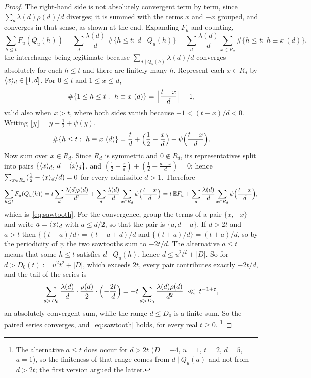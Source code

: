 \documentclass[11pt,a4paper]{article}
\theoremstyle{remark}\newtheorem{remark}[theorem]{Remark}
\begin{document}
\begin{proof}
The right-hand side is not absolutely convergent term by term, since $\sum_d\lambda(d)\rho(d)/d$ diverges; it is summed
with the terms $x$ and $-x$ grouped, and converges in that sense, as shown at the end. Expanding $F_u$ and counting,
\[
\sum_{h\le t}F_u(Q_u(h))=\sum_{d}\frac{\lambda(d)}d\,\#\{h\le t:\ d\mid Q_u(h)\}
=\sum_{d}\frac{\lambda(d)}d\sum_{x\in R_d}\#\{h\le t:\ h\equiv x\ (d)\},
\]
the interchange being legitimate because $\sum_{d\mid Q_u(h)}\lambda(d)/d$ converges absolutely for each $h\le t$ and
there are finitely many $h$. Represent each $x\in R_d$ by $\langle x\rangle_{d}\in[1,d]$. For $0\le t$ and $1\le x\le d$,
\[
\#\{1\le h\le t:\ h\equiv x\ (d)\}=\Bigl\lfloor\frac{t-x}d\Bigr\rfloor+1,
\]
valid also when $x>t$, where both sides vanish because $-1<(t-x)/d<0$. Writing $\lfloor y\rfloor=y-\tfrac12+\psi(y)$,
\[
\#\{h\le t:\ h\equiv x\ (d)\}=\frac td+\Bigl(\frac12-\frac xd\Bigr)+\psi\Bigl(\frac{t-x}d\Bigr).
\]
Now sum over $x\in R_d$. Since $R_d$ is symmetric and $0\notin R_d$, its representatives split into pairs
$\{\langle x\rangle_{d},\,d-\langle x\rangle_{d}\}$, and $(\tfrac12-\tfrac xd)+(\tfrac12-\tfrac{d-x}d)=0$; hence
$\sum_{x\in R_d}(\tfrac12-\langle x\rangle_{d}/d)=0$ for every admissible $d>1$. Therefore
\[
\sum_{h\le t}F_u(Q_u(h))=t\sum_{d}\frac{\lambda(d)\rho(d)}{d^2}+\sum_d\frac{\lambda(d)}d\sum_{x\in R_d}\psi\Bigl(\frac{t-x}d\Bigr)
=t\,\mathbb EF_u+\sum_d\frac{\lambda(d)}d\sum_{x\in R_d}\psi\Bigl(\frac{t-x}d\Bigr),
\]
which is~\eqref{eq:sawtooth}. For the convergence, group the terms of a pair $\{x,-x\}$ and write $a=\langle x\rangle_{d}$ with
$a\le d/2$, so that the pair is $\{a,d-a\}$. If $d>2t$ and $a>t$ then $\{(t-a)/d\}=(t-a+d)/d$ and
$\{(t+a)/d\}=(t+a)/d$, so by the periodicity of $\psi$ the two sawtooths sum to $-2t/d$. The alternative $a\le t$
means that some $h\le t$ satisfies $d\mid Q_u(h)$, hence $d\le u^2t^2+|D|$. So for $d>D_0(t):=u^2t^2+|D|$, which
exceeds $2t$, every pair contributes exactly $-2t/d$, and the tail of the series is
\[
\sum_{d>D_0}\frac{\lambda(d)}d\cdot\frac{\rho(d)}2\cdot\Bigl(-\frac{2t}d\Bigr)=-t\sum_{d>D_0}\frac{\lambda(d)\rho(d)}{d^2}
\ \ll\ t^{-1+\varepsilon},
\]
an absolutely convergent sum, while the range $d\le D_0$ is a finite sum. So the paired series converges,
and~\eqref{eq:sawtooth} holds, for every real $t\ge0$. \footnote{The alternative $a\le t$ does occur for $d>2t$
($D=-4$, $u=1$, $t=2$, $d=5$, $a=1$), so the finiteness of that range comes from $d\mid Q_u(a)$ and not from
$d>2t$; the first version argued the latter.}
\end{proof}
\end{document}

